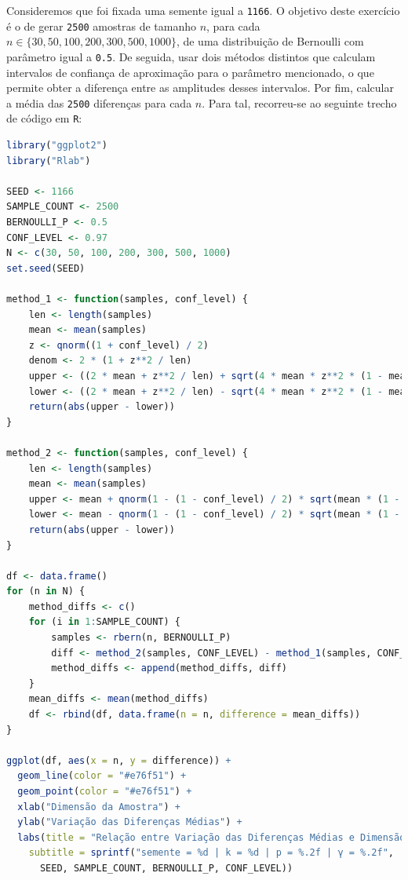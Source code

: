 \documentclass[12pt,a4paper]{article}
\begin{document}
Consideremos que foi fixada uma semente igual a \texttt{1166}.
O objetivo deste exercício é o de gerar \texttt{2500} amostras de tamanho $n$, para cada $ n \in \{30, 50, 100, 200, 300, 500, 1000\}$, de uma distribuição de Bernoulli com parâmetro igual a \texttt{0.5}.
De seguida, usar dois métodos distintos que calculam intervalos de confiança de aproximação para o parâmetro mencionado, o que permite obter a diferença entre as amplitudes desses intervalos.
Por fim, calcular a média das \texttt{2500} diferenças para cada $n$.
Para tal, recorreu-se ao seguinte trecho de código em \texttt{R}:

\quad

\begin{lstlisting}[language=R]
library("ggplot2")
library("Rlab")

SEED <- 1166
SAMPLE_COUNT <- 2500
BERNOULLI_P <- 0.5
CONF_LEVEL <- 0.97
N <- c(30, 50, 100, 200, 300, 500, 1000)
set.seed(SEED)

method_1 <- function(samples, conf_level) {
    len <- length(samples)
    mean <- mean(samples)
    z <- qnorm((1 + conf_level) / 2)
    denom <- 2 * (1 + z**2 / len)
    upper <- ((2 * mean + z**2 / len) + sqrt(4 * mean * z**2 * (1 - mean) / len + z**4 / len**2)) / denom
    lower <- ((2 * mean + z**2 / len) - sqrt(4 * mean * z**2 * (1 - mean) / len + z**4 / len**2)) / denom
    return(abs(upper - lower))
}

method_2 <- function(samples, conf_level) {
    len <- length(samples)
    mean <- mean(samples)
    upper <- mean + qnorm(1 - (1 - conf_level) / 2) * sqrt(mean * (1 - mean) / len)
    lower <- mean - qnorm(1 - (1 - conf_level) / 2) * sqrt(mean * (1 - mean) / len)
    return(abs(upper - lower))
}

df <- data.frame()
for (n in N) {
    method_diffs <- c()
    for (i in 1:SAMPLE_COUNT) {
        samples <- rbern(n, BERNOULLI_P)
        diff <- method_2(samples, CONF_LEVEL) - method_1(samples, CONF_LEVEL)
        method_diffs <- append(method_diffs, diff)
    }
    mean_diffs <- mean(method_diffs)
    df <- rbind(df, data.frame(n = n, difference = mean_diffs))
}

ggplot(df, aes(x = n, y = difference)) +
  geom_line(color = "#e76f51") +
  geom_point(color = "#e76f51") +
  xlab("Dimensão da Amostra") +
  ylab("Variação das Diferenças Médias") +
  labs(title = "Relação entre Variação das Diferenças Médias e Dimensão da Amostra",
    subtitle = sprintf("semente = %d | k = %d | p = %.2f | γ = %.2f",
      SEED, SAMPLE_COUNT, BERNOULLI_P, CONF_LEVEL))
\end{lstlisting}
\end{document}
